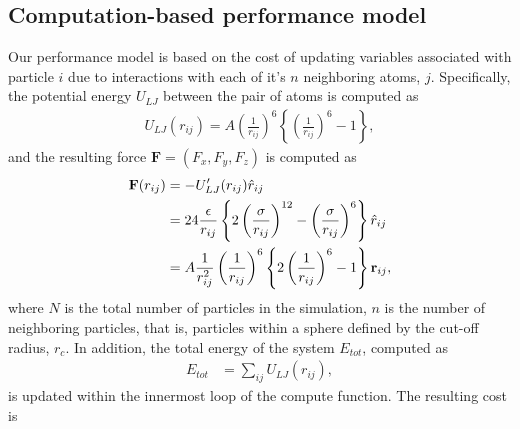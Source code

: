 \documentclass[12pt]{article}
\begin{document}
\subsection{Computation-based performance model}
\noindent Our performance model is based on the cost of updating variables associated
with particle $i$ due to interactions with each of it's $n$ neighboring atoms, $j$. Specifically,
the potential energy $U_{LJ}$ between the pair of atoms is computed as
\begin{align}
    U_{LJ}(r_{ij}) = A\left(\frac{1}{r_{ij}}\right)^{6}\left\{ \left(\frac{1}{r_{ij}}\right)^{6} - 1 \right\},           
\end{align}            
and the resulting force $\textbf{F} = (F_x, F_y, F_z)$ is computed as
\begin{align}
    \textbf{F}(r_{ij}) &= - U'_{LJ}(r_{ij})\hat{r}_{ij} \notag\\
        &= 24 \frac{\epsilon}{r_{ij}} \left\{ 2 \left(\frac{\sigma}{r_{ij}}\right)^{12}
              - \left(\frac{\sigma}{r_{ij}}\right)^6 \right\} \hat{r}_{ij} \notag\\
        &=  A \frac{1}{r_{ij}^2} \left(\frac{1}{r_{ij}}\right)^{6} \left\{ 2 \left(\frac{1}{r_{ij}}\right)^{6}
              - 1 \right\} \textbf{r}_{ij},
\end{align}
where $N$ is the total number of particles in the simulation, $n$ is the number of neighboring
particles, that is, particles within a sphere defined by the cut-off radius, $r_c$. In addition,
the total energy of the system $E_{tot}$, computed as
\begin{align}
    E_{tot} &= \sum_{ij} U_{LJ}(r_{ij}),
\end{align}
is updated within the innermost loop of the compute function. The resulting cost is
\end{document}
